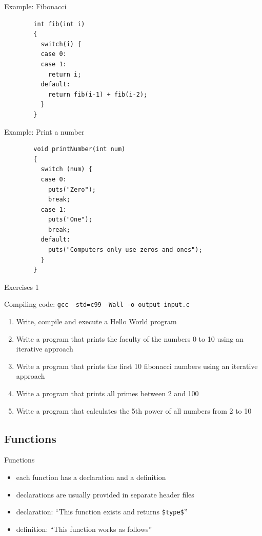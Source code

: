 \documentclass[english,compress]{beamer}
\begin{document}
\begin{frame}[fragile]{Example: Fibonacci}
	\begin{lstlisting}
		int fib(int i)
		{
		  switch(i) {
		  case 0:
		  case 1:
		    return i;
		  default:
		    return fib(i-1) + fib(i-2);
		  }
		}
	\end{lstlisting}
\end{frame}

\begin{frame}[fragile]{Example: Print a number}
	\begin{lstlisting}
		void printNumber(int num)
		{
		  switch (num) {
		  case 0:
		    puts("Zero");
		    break;
		  case 1:
		    puts("One");
		    break;
		  default:
		    puts("Computers only use zeros and ones");
		  }
		}
	\end{lstlisting}
\end{frame}

\begin{frame}[fragile]{Exercises 1}
	\begin{center}
		Compiling code: \verb|gcc -std=c99 -Wall -o output input.c|
	\end{center}
	\begin{enumerate}
		\item Write, compile and execute a Hello World program
		\item Write a program that prints the faculty of the numbers 0 to 10 using an iterative approach
		\item Write a program that prints the first 10 fibonacci numbers using an iterative approach
		\item Write a program that prints all primes between 2 and 100
		\item Write a program that calculates the 5th power of all numbers from 2 to 10
	\end{enumerate}
\end{frame}

\subsection{Functions}
\begin{frame}{Functions}
	\begin{itemize}
		\item each function has a declaration and a definition
		\item declarations are usually provided in separate header files
		\item declaration: ``This function exists and returns {\color{blue}\lstinline|$type$|}''
		\item definition: ``This function works as follows''
	\end{itemize}
\end{frame}
\end{document}
